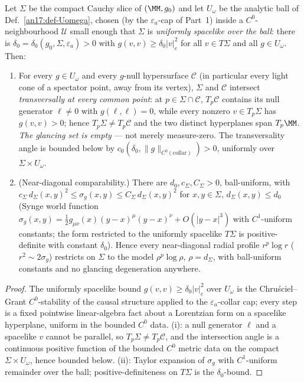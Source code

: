 \begin{lemma}\label{an17:no-glancing}
Let $\Sigma$ be the compact Cauchy slice of $(\MM,g_0)$ and let $U_\omega$ be
the analytic ball of Def.~\ref{an17:def-Uomega}, chosen (by the
$\varepsilon_a$-cap of Part~1) inside a $C^0$-neighbourhood $\mathcal U$ small
enough that $\Sigma$ is \emph{uniformly spacelike over the ball}: there is
$\delta_0=\delta_0(g_0,\Sigma,\varepsilon_a)>0$ with $g(v,v)\ge\delta_0|v|_e^2$
for all $v\in T\Sigma$ and all $g\in U_\omega$. Then:
\begin{enumerate}[label=\textup{(\roman*)},leftmargin=*,nosep]
\item For every $g\in U_\omega$ and every $g$-null hypersurface $\mathcal C$
  (in particular every light cone of a spectator point, away from its vertex),
  $\Sigma$ and $\mathcal C$ intersect \emph{transversally at every common
  point}: at $p\in\Sigma\cap\mathcal C$, $T_p\mathcal C$ contains its null
  generator $\ell\neq0$ with $g(\ell,\ell)=0$, while every nonzero
  $v\in T_p\Sigma$ has $g(v,v)>0$; hence $T_p\Sigma\neq T_p\mathcal C$ and the
  two distinct hyperplanes span $T_p\MM$. \emph{The glancing set is empty} ---
  not merely measure-zero. The transversality angle is bounded below by
  $c_0(\delta_0,\|g\|_{C^0(\mathrm{collar})})>0$, uniformly over
  $\Sigma\times U_\omega$.
\item \textup{(Near-diagonal comparability.)} There are $d_0,c_\Sigma,
  C_\Sigma>0$, ball-uniform, with
  $c_\Sigma\,d_\Sigma(x,y)^2\le\sigma_g(x,y)\le C_\Sigma\,d_\Sigma(x,y)^2$
  for $x,y\in\Sigma$, $d_\Sigma(x,y)\le d_0$ (Synge world function
  $\sigma_g(x,y)=\tfrac12 g_{\mu\nu}(x)(y-x)^\mu(y-x)^\nu+O(|y-x|^3)$ with
  $C^1$-uniform constants; the form restricted to the uniformly spacelike
  $T\Sigma$ is positive-definite with constant $\delta_0$). Hence every
  near-diagonal radial profile $r^p\log r$ ($r^2\sim2\sigma_g$) restricts on
  $\Sigma$ to the model $\rho^p\log\rho$, $\rho=d_\Sigma$, with ball-uniform
  constants and no glancing degeneration anywhere.
\end{enumerate}
\end{lemma}

\begin{proof}
The uniformly spacelike bound $g(v,v)\ge\delta_0|v|_e^2$ over $U_\omega$ is the
Chru\'sciel--Grant $C^0$-stability of the causal structure
\cite{ChruscielGrant2012} applied to the $\varepsilon_a$-collar cap; every
step is a fixed pointwise linear-algebra fact about a Lorentzian form on a
spacelike hyperplane, uniform in the bounded $C^0$ data. (i): a null generator
$\ell$ and a spacelike $v$ cannot be parallel, so $T_p\Sigma\neq T_p\mathcal C$,
and the intersection angle is a continuous positive function of the bounded
$C^0$ metric data on the compact $\Sigma\times U_\omega$, hence bounded below.
(ii): Taylor expansion of $\sigma_g$ with $C^1$-uniform remainder over the ball;
positive-definiteness on $T\Sigma$ is the $\delta_0$-bound.
\end{proof}

